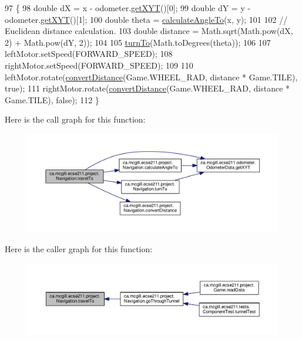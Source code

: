 \begin{DoxyCode}
97                                            \{
98     \textcolor{keywordtype}{double} dX = x - odometer.\hyperlink{classca_1_1mcgill_1_1ecse211_1_1odometer_1_1_odometer_data_a8f40f0264c68f0cbed4fff1723ae7863}{getXYT}()[0];
99     \textcolor{keywordtype}{double} dY = y - odometer.\hyperlink{classca_1_1mcgill_1_1ecse211_1_1odometer_1_1_odometer_data_a8f40f0264c68f0cbed4fff1723ae7863}{getXYT}()[1];
100     \textcolor{keywordtype}{double} theta = \hyperlink{classca_1_1mcgill_1_1ecse211_1_1project_1_1_navigation_a4376e54162df8f123ca3b52e4fd2f38d}{calculateAngleTo}(x, y);
101 
102     \textcolor{comment}{// Euclidean distance calculation.}
103     \textcolor{keywordtype}{double} distance = Math.sqrt(Math.pow(dX, 2) + Math.pow(dY, 2));
104 
105     \hyperlink{classca_1_1mcgill_1_1ecse211_1_1project_1_1_navigation_a3bbe0645f2b3b3d0986b4a707fb5a00c}{turnTo}(Math.toDegrees(theta));
106 
107     leftMotor.setSpeed(FORWARD\_SPEED);
108     rightMotor.setSpeed(FORWARD\_SPEED);
109 
110     leftMotor.rotate(\hyperlink{classca_1_1mcgill_1_1ecse211_1_1project_1_1_navigation_ac9e260bcd619ffa4820d7d0de7ea1c12}{convertDistance}(Game.WHEEL\_RAD, distance * Game.TILE), \textcolor{keyword}{true});
111     rightMotor.rotate(\hyperlink{classca_1_1mcgill_1_1ecse211_1_1project_1_1_navigation_ac9e260bcd619ffa4820d7d0de7ea1c12}{convertDistance}(Game.WHEEL\_RAD, distance * Game.TILE), \textcolor{keyword}{false});
112   \}
\end{DoxyCode}
Here is the call graph for this function\+:\nopagebreak
\begin{figure}[H]
\begin{center}
\leavevmode
\includegraphics[width=350pt]{classca_1_1mcgill_1_1ecse211_1_1project_1_1_navigation_ad89b3dd084d81b4ec4d89ea73ba13eaa_cgraph}
\end{center}
\end{figure}
Here is the caller graph for this function\+:\nopagebreak
\begin{figure}[H]
\begin{center}
\leavevmode
\includegraphics[width=350pt]{classca_1_1mcgill_1_1ecse211_1_1project_1_1_navigation_ad89b3dd084d81b4ec4d89ea73ba13eaa_icgraph}
\end{center}
\end{figure}
